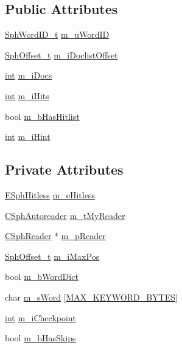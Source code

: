 \subsection*{Public Attributes}
\begin{DoxyCompactItemize}
\item 
\hyperlink{sphinx_8h_a80a94d5984fdf9214a98f3e5e65df963}{Sph\-Word\-I\-D\-\_\-t} \hyperlink{classCSphDictReader_a7d418315d3e96c281ab9ba0caf9ab873}{m\-\_\-u\-Word\-I\-D}
\item 
\hyperlink{sphinx_8h_a0fb3b64afebef33c61367714754eaa90}{Sph\-Offset\-\_\-t} \hyperlink{classCSphDictReader_a6bef1a1487783775479c60ff63338e19}{m\-\_\-i\-Doclist\-Offset}
\item 
\hyperlink{sphinxexpr_8cpp_a4a26e8f9cb8b736e0c4cbf4d16de985e}{int} \hyperlink{classCSphDictReader_a4a0d8f5686aded362e2c530b341378cc}{m\-\_\-i\-Docs}
\item 
\hyperlink{sphinxexpr_8cpp_a4a26e8f9cb8b736e0c4cbf4d16de985e}{int} \hyperlink{classCSphDictReader_a1d0be92902f6cff16e462277a9528056}{m\-\_\-i\-Hits}
\item 
bool \hyperlink{classCSphDictReader_a008769ed0080f70fb394c2298a88e0df}{m\-\_\-b\-Has\-Hitlist}
\item 
\hyperlink{sphinxexpr_8cpp_a4a26e8f9cb8b736e0c4cbf4d16de985e}{int} \hyperlink{classCSphDictReader_aa4de3149ff055b416d76131111c19fe2}{m\-\_\-i\-Hint}
\end{DoxyCompactItemize}
\subsection*{Private Attributes}
\begin{DoxyCompactItemize}
\item 
\hyperlink{sphinx_8h_a1920852c5151009d65cf2bc8204a685b}{E\-Sph\-Hitless} \hyperlink{classCSphDictReader_a456770410ba1b7983bfa7056801d87f2}{m\-\_\-e\-Hitless}
\item 
\hyperlink{classCSphAutoreader}{C\-Sph\-Autoreader} \hyperlink{classCSphDictReader_aaadcd186a03d6298bca770e856bad831}{m\-\_\-t\-My\-Reader}
\item 
\hyperlink{classCSphReader}{C\-Sph\-Reader} $\ast$ \hyperlink{classCSphDictReader_a33aec953cff4ae5fc253167d51c894e9}{m\-\_\-p\-Reader}
\item 
\hyperlink{sphinx_8h_a0fb3b64afebef33c61367714754eaa90}{Sph\-Offset\-\_\-t} \hyperlink{classCSphDictReader_a220c33d6373a862120a7e2af84a06ede}{m\-\_\-i\-Max\-Pos}
\item 
bool \hyperlink{classCSphDictReader_a5c1784c9c78cea2e4031f117fbc8273e}{m\-\_\-b\-Word\-Dict}
\item 
char \hyperlink{classCSphDictReader_aa6478d98e28c6f076a35181fe1e9355f}{m\-\_\-s\-Word} \mbox{[}\hyperlink{sphinx_8cpp_aeb328d19a9780d5c5defcd7e9b08239b}{M\-A\-X\-\_\-\-K\-E\-Y\-W\-O\-R\-D\-\_\-\-B\-Y\-T\-E\-S}\mbox{]}
\item 
\hyperlink{sphinxexpr_8cpp_a4a26e8f9cb8b736e0c4cbf4d16de985e}{int} \hyperlink{classCSphDictReader_a344c07503cbed21b30dfa575916dae5b}{m\-\_\-i\-Checkpoint}
\item 
bool \hyperlink{classCSphDictReader_a97e57292f2bd7f1f7453aadf46c5c280}{m\-\_\-b\-Has\-Skips}
\end{DoxyCompactItemize}


